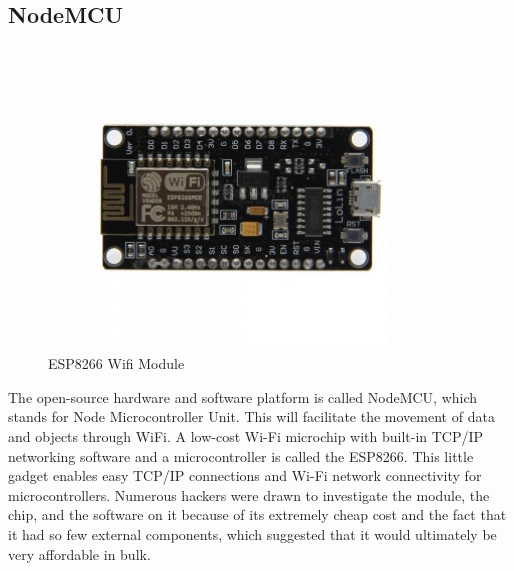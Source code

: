 \documentclass[12pt,a4paper,twocolumn,fleqn]{article}
\begin{document}
\subsection{NodeMCU}
\begin{figure} [H]
\includegraphics[width=10cm,height=8cm]{media/Esp8266.jpg}
\centering
\caption{ESP8266 Wifi Module}
\end{figure}
The open-source hardware and software platform is called NodeMCU, which stands for Node Microcontroller Unit. This will facilitate the movement of data and objects through WiFi.
A low-cost Wi-Fi microchip with built-in TCP/IP networking software and a microcontroller is called the ESP8266. This little gadget enables easy TCP/IP connections and Wi-Fi network connectivity for microcontrollers. Numerous hackers were drawn to investigate the module, the chip, and the software on it because of its extremely cheap cost and the fact that it had so few external components, which suggested that it would ultimately be very affordable in bulk.
\end{document}
